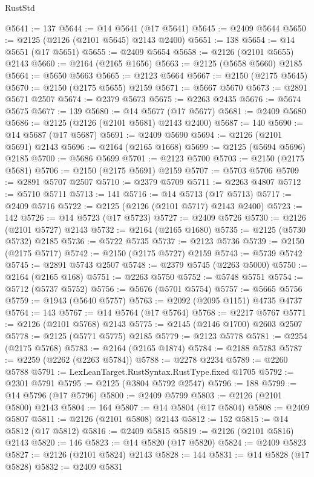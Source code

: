 \begin{lexlean}{RustStd}
\begin{coremodule}
@5641 := 137
@5644 := @14 @5641 (@17 @5641)
@5645 := @2409 @5644
@5650 := @2125 (@2126 (@2101 @5645) @2143 @2400)
@5651 := 138
@5654 := @14 @5651 (@17 @5651)
@5655 := @2409 @5654
@5658 := @2126 (@2101 @5655) @2143
@5660 := @2164 (@2165 @1656)
@5663 := @2125 (@5658 @5660) @2185
@5664 := @5650 @5663
@5665 := @2123 @5664
@5667 := @2150 (@2175 @5645)
@5670 := @2150 (@2175 @5655) @2159
@5671 := @5667 @5670
@5673 := @2891 @5671 @2507
@5674 := @2379 @5673
@5675 := @2263 @2435
@5676 := @5674 @5675
@5677 := 139
@5680 := @14 @5677 (@17 @5677)
@5681 := @2409 @5680
@5686 := @2125 (@2126 (@2101 @5681) @2143 @2400)
@5687 := 140
@5690 := @14 @5687 (@17 @5687)
@5691 := @2409 @5690
@5694 := @2126 (@2101 @5691) @2143
@5696 := @2164 (@2165 @1668)
@5699 := @2125 (@5694 @5696) @2185
@5700 := @5686 @5699
@5701 := @2123 @5700
@5703 := @2150 (@2175 @5681)
@5706 := @2150 (@2175 @5691) @2159
@5707 := @5703 @5706
@5709 := @2891 @5707 @2507
@5710 := @2379 @5709
@5711 := @2263 @4807
@5712 := @5710 @5711
@5713 := 141
@5716 := @14 @5713 (@17 @5713)
@5717 := @2409 @5716
@5722 := @2125 (@2126 (@2101 @5717) @2143 @2400)
@5723 := 142
@5726 := @14 @5723 (@17 @5723)
@5727 := @2409 @5726
@5730 := @2126 (@2101 @5727) @2143
@5732 := @2164 (@2165 @1680)
@5735 := @2125 (@5730 @5732) @2185
@5736 := @5722 @5735
@5737 := @2123 @5736
@5739 := @2150 (@2175 @5717)
@5742 := @2150 (@2175 @5727) @2159
@5743 := @5739 @5742
@5745 := @2891 @5743 @2507
@5748 := @2379 @5745 (@2263 @5000)
@5750 := @2164 (@2165 @168)
@5751 := @2263 @5750
@5752 := @5748 @5751
@5754 := @5712 (@5737 @5752)
@5756 := @5676 (@5701 @5754)
@5757 := @5665 @5756
@5759 := @1943 (@5640 @5757)
@5763 := @2092 (@2095 @1151) @4735 @4737
@5764 := 143
@5767 := @14 @5764 (@17 @5764)
@5768 := @2217 @5767
@5771 := @2126 (@2101 @5768) @2143
@5775 := @2145 (@2146 @1700) @2603 @2507
@5778 := @2125 (@5771 @5775) @2185
@5779 := @2123 @5778
@5781 := @2254 (@2175 @5768)
@5783 := @2164 (@2165 @1874)
@5784 := @2188 @5783
@5787 := @2259 (@2262 (@2263 @5784))
@5788 := @2278 @2234
@5789 := @2260 @5788
@5791 := LexLeanTarget.RustSyntax.RustType.fixed @1705
@5792 := @2301 @5791
@5795 := @2125 (@3804 @5792 @2547)
@5796 := 188
@5799 := @14 @5796 (@17 @5796)
@5800 := @2409 @5799
@5803 := @2126 (@2101 @5800) @2143
@5804 := 164
@5807 := @14 @5804 (@17 @5804)
@5808 := @2409 @5807
@5811 := @2126 (@2101 @5808) @2143
@5812 := 152
@5815 := @14 @5812 (@17 @5812)
@5816 := @2409 @5815
@5819 := @2126 (@2101 @5816) @2143
@5820 := 146
@5823 := @14 @5820 (@17 @5820)
@5824 := @2409 @5823
@5827 := @2126 (@2101 @5824) @2143
@5828 := 144
@5831 := @14 @5828 (@17 @5828)
@5832 := @2409 @5831

\end{coremodule}
\end{lexlean}

